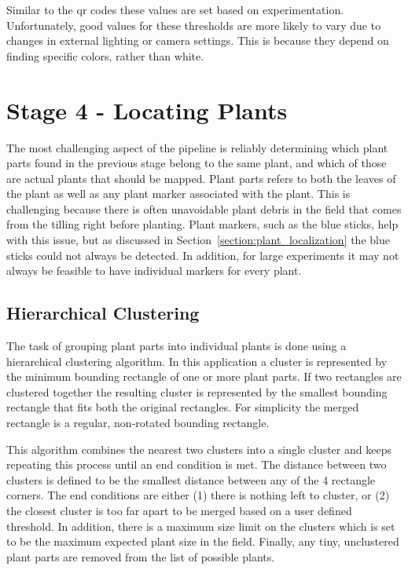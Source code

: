 Similar to the \ac{qr} codes these values are set based on experimentation.   Unfortunately, good values for these thresholds are more likely to vary due to changes in external lighting or camera settings.  This is because they depend on finding specific colors, rather than white.  

\section{Stage 4 - Locating Plants}
\label{processing-stage4}

The most challenging aspect of the pipeline is reliably determining which plant parts found in the previous stage belong to the same plant, and which of those are actual plants that should be mapped.  Plant parts refers to both the leaves of the plant as well as any plant marker associated with the plant.  This is challenging because there is often unavoidable plant debris in the field that comes from the tilling right before planting. Plant markers, such as the blue sticks, help with this issue, but as discussed in Section~\ref{section:plant_localization} the blue sticks could not always be detected.  In addition, for large experiments it may not always be feasible to have individual markers for every plant.  

\subsection{Hierarchical Clustering}

The task of grouping plant parts into individual plants is done using a hierarchical clustering algorithm.  In this application a cluster is represented by the minimum bounding rectangle of one or more plant parts.  If two rectangles are clustered together the resulting cluster is represented by the smallest bounding rectangle that fits both the original rectangles.  For simplicity the merged rectangle is a regular, non-rotated bounding rectangle. 

This algorithm combines the nearest two clusters into a single cluster and keeps repeating this process until an end condition is met.  The distance between two clusters is defined to be the smallest distance between any of the 4 rectangle corners.  The end conditions are either (1) there is nothing left to cluster, or (2) the closest cluster is too far apart to be merged based on a user defined threshold.  In addition, there is a maximum size limit on the clusters which is set to be the maximum expected plant size in the field.  Finally, any tiny, unclustered plant parts are removed from the list of possible plants. 

